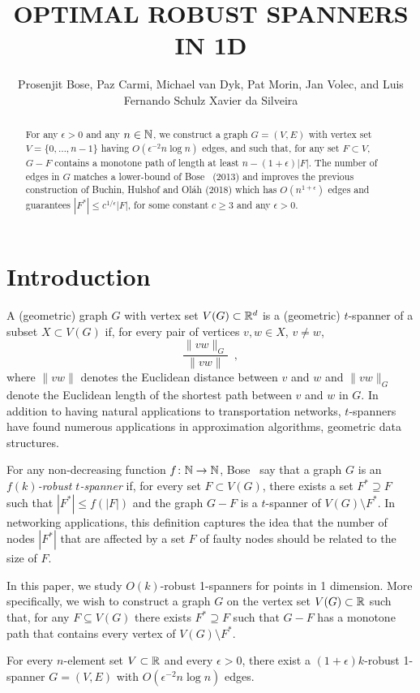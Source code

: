 \documentclass{patmorin}
\title{\MakeUppercase{Optimal Robust Spanners in 1D}}
\author{Prosenjit Bose, Paz Carmi, Michael van Dyk, Pat Morin, 
  Jan Volec, and 
  \newline
  Luis Fernando Schulz Xavier da Silveira}
\begin{document}
\maketitle


\begin{abstract}
  For any $\epsilon >0$ and any $n\in\mathbb{N}$, we construct a graph $G=(V,E)$
  with vertex set $V=\{0,\ldots,n-1\}$ having $O(\epsilon^{-2}n\log
  n)$ edges, and such
  that, for any set $F\subset V$, $G-F$ contains a monotone path of length
  at least $n-(1+\epsilon)|F|$.  The number of edges in $G$ matches a
  lower-bound of Bose \etal\ (2013) and improves the previous construction
  of Buchin, Hulshof and Ol\'ah (2018) which has $O(n^{1+\epsilon})$
  edges and guarantees $|F^*|\le c^{1/\epsilon}|F|$, for some constant
  $c\ge 3$ and any $\epsilon >0$.
\end{abstract}

\section{Introduction}

A (geometric) graph $G$ with vertex set $V(G)\subset\mathbb{R}^d$ is a (geometric)
$t$-spanner of a subset $X\subset V(G)$ if, for every pair of vertices
$v,w\in X$, $v\neq w$,
\[
	\frac{\|vw\|_G}{\|vw\|} \enspace ,
\]
where $\|vw\|$ denotes the Euclidean distance between $v$ and $w$ and
$\|vw\|_G$ denote the Euclidean length of the shortest path between
$v$ and $w$ in $G$.  In addition to having natural applications to
transportation networks, $t$-spanners have found numerous applications
in approximation algorithms, geometric data structures.

For any non-decreasing function $f\colon\mathbb{N}\to\mathbb{N}$, Bose \etal\ say that
a graph $G$ is an \emph{$f(k)$-robust $t$-spanner} if, for every set
$F\subset V(G)$, there exists a set $F^*\supseteq F$ such that $|F^*|\le
f(|F|)$ and the graph $G-F$ is a $t$-spanner of $V(G)\setminus F^*$.
In networking applications, this definition captures the idea that the
number of nodes $|F^*|$ that are affected by a set $F$ of faulty nodes
should be related to the size of $F$.

In this paper, we study $O(k)$-robust 1-spanners for points in 1 dimension.  More specifically, we wish to construct a graph $G$ on the vertex set $V(G)\subset\mathbb{R}$ such that, for any $F\subseteq V(G)$ there exists $F^*\supseteq F$ such that $G-F$ has a monotone path that contains every vertex of $V(G)\setminus F^*$.

\begin{thm}
  For every $n$-element set $V\subset\mathbb{R}$ and every $\epsilon>0$, there
  exist a $(1+\epsilon)k$-robust 1-spanner $G=(V,E)$ with $O(\epsilon^{-2}n\log
  n)$ edges.
\end{thm}
\end{document}
